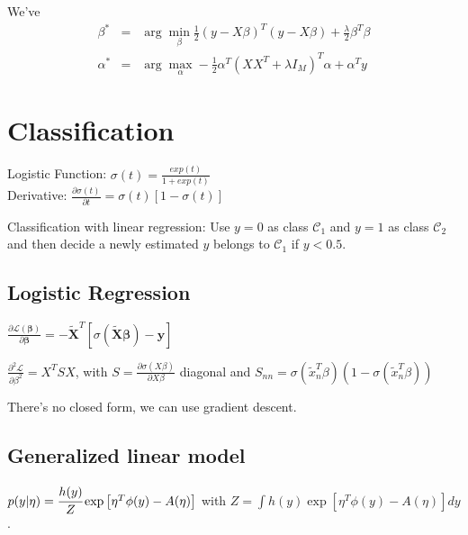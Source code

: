 \documentclass[10pt,a4paper,landscape]{article}
\renewcommand{\bf}[1]{\ensuremath{\mathbf{#1}}}
\newcommand{\bbeta}{\boldsymbol\beta}
\begin{document}
\begin{multicols*}{4}
We've
\begin{eqnarray*}
    \beta^* &=& \arg\min_\beta \frac{1}{2}(y-X\beta)^T(y-X\beta) + \frac{\lambda}{2}\beta^T\beta\\
    \alpha^* &=& \arg\max_\alpha -\frac{1}{2}\alpha^T(XX^T + \lambda I_M)^T\alpha + \alpha^Ty
\end{eqnarray*}


\section{Classification}
Logistic Function: $\sigma(t) = \frac{exp(t)}{1+exp(t)}$\\
Derivative: $\frac{ \partial\sigma(t) }{ \partial t } = \sigma(t)[ 1 - \sigma(t) ]$

Classification with linear regression: Use $y = 0$ as class $\mathcal{C}_1$
and $y = 1$ as class $\mathcal{C}_2$ and then decide a newly estimated $y$ belongs
to $\mathcal{C}_1$ if $y < 0.5$.

\subsection{Logistic Regression}
$\frac{ \partial\mathcal{L}(\bbeta) }{ \partial \bbeta } = -\tilde{\bf{X}}^T [\sigma(\tilde{\bf{X}} \bbeta) - \bf{y}]$

$\frac{\partial^2\mathcal{L}}{\partial \beta^2} = X^TSX$, with $S = \frac{\partial \sigma(X\beta)}{\partial X\beta}$ diagonal and $S_{nn} = \sigma(\tilde{x}_n^T\beta)(1-\sigma(\tilde{x}_n^T\beta))$

There's no closed form, we can use gradient descent.

\subsection{Generalized linear model}
$p(y|\eta) = \cfrac{h(y)}{Z}\exp\left[ \eta^T\phi(y) - A(\eta) \right]$ with $Z = \int h(y)\exp\left[ \eta^T\phi(y) - A(\eta) \right]dy$.


\end{multicols*}
\end{document}
